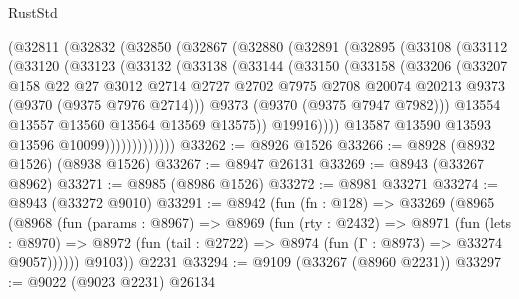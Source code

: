 \begin{lexlean}{RustStd}
\begin{coremodule}
{\begin{coremodule}
{{{{{{{{{{{{{{{{{{{{{{{{{{{{{{{{{{{{{{{          (@32811
            (@32832
              (@32850
                (@32867
                  (@32880
                    (@32891
                      (@32895
                        (@33108
                          (@33112
                            (@33120
                              (@33123
                                (@33132
                                  (@33138
                                    (@33144
                                      (@33150
                                        (@33158
                                          (@33206
                                            (@33207
                                              @158
                                              @22
                                              @27
                                              @3012
                                              @2714
                                              @2727
                                              @2702
                                              @7975
                                              @2708
                                              @20074
                                              @20213
                                              @9373
                                              (@9370 (@9375 @7976 @2714)))
                                            @9373
                                            (@9370 (@9375 @7947 @7982)))
                                          @13554
                                          @13557
                                          @13560
                                          @13564
                                          @13569
                                          @13575))
                                      @19916))))
                              @13587
                              @13590
                              @13593
                              @13596
                              @10099)))))))))))))
@33262 := @8926 @1526
@33266 := @8928 (@8932 @1526) (@8938 @1526)
@33267 := @8947 @26131
@33269 := @8943 (@33267 @8962)
@33271 := @8985 (@8986 @1526)
@33272 := @8981 @33271
@33274 := @8943 (@33272 @9010)
@33291 := @8942
    (fun (fn : @128) =>
    @33269
      (@8965
        (@8968
          (fun (params : @8967) =>
          @8969
            (fun (rty : @2432) =>
            @8971
              (fun (lets : @8970) =>
              @8972 (fun (tail : @2722) => @8974 (fun (Γ : @8973) => @33274 @9057))))))
        @9103))
    @2231
@33294 := @9109 (@33267 (@8960 @2231))
@33297 := @9022 (@9023 @2231) @26134
}}}}}}}}}}}}}}}}}}}}}}}}}}}}}}}}}}}}}}}
\end{coremodule}}
\end{coremodule}
\end{lexlean}
